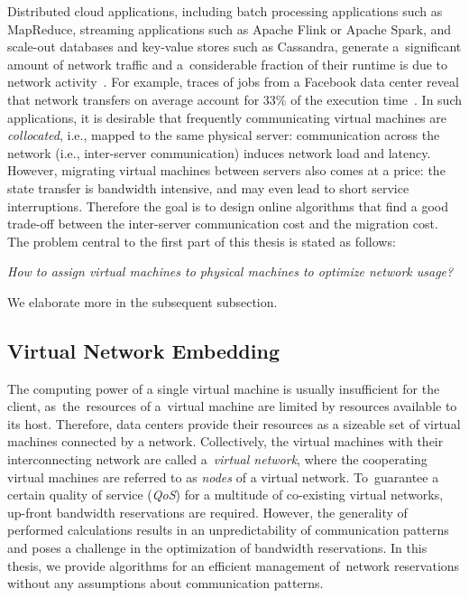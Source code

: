 Distributed cloud applications, including batch processing
applications such as MapReduce, streaming applications such as Apache Flink or
Apache Spark, and scale-out databases and key-value stores such as Cassandra,
generate a~significant amount of network traffic and a~considerable fraction
of their runtime is due to network activity~\cite{MogPop12}. For example,
traces of jobs from a Facebook data center reveal that network transfers on
average account for 33\% of the execution time~\cite{orchestra}. In such
applications, it is desirable that frequently communicating virtual machines
are \emph{collocated}, i.e., mapped to the same physical server: 
communication across the network (i.e., inter-server communication) induces
network load and latency. However, migrating virtual machines between servers
also comes at a price: the state transfer is bandwidth intensive, and may even
lead to short service interruptions. Therefore the goal is to design online
algorithms that find a good trade-off between the inter-server communication
cost and the migration cost.
%
The problem central to the first part of this thesis is stated as follows:

\begin{center}
  \emph{How to assign virtual machines to physical machines to optimize network
  usage?}
\end{center}
We elaborate more in the subsequent subsection.

\subsection{Virtual Network Embedding}
\label{sec:virt_net_emb}

The computing power of a single virtual machine is usually insufficient for the client, as~the~resources of a~virtual machine are limited by resources available to its host.
Therefore, data centers provide their resources as a sizeable set of virtual machines connected by a network.
Collectively, the virtual machines with their interconnecting network are called a~\emph{virtual network}, where the cooperating virtual machines are referred to as \emph{nodes} of a virtual network.
To~guarantee a certain quality of service (\emph{QoS}) for a multitude of co-existing virtual networks, up-front bandwidth reservations are required.
However, the generality of performed calculations results in an unpredictability of communication patterns and poses a challenge in the optimization of bandwidth reservations.
In this thesis, we provide algorithms for an efficient management of~network reservations without any assumptions about communication patterns.

